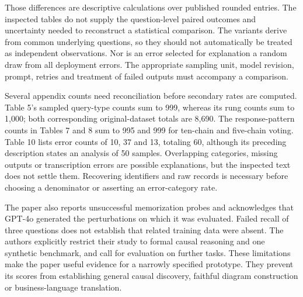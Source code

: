 Those differences are descriptive calculations over published rounded entries.
The inspected tables do not supply the question-level paired outcomes and
uncertainty needed to reconstruct a statistical comparison. The variants derive
from common underlying questions, so they should not automatically be treated
as independent observations. Nor is an error selected for explanation a random
draw from all deployment errors. The appropriate sampling unit, model revision,
prompt, retries and treatment of failed outputs must accompany a comparison.

Several appendix counts need reconciliation before secondary rates are computed.
Table 5's sampled query-type counts sum to 999, whereas its rung counts sum to
1,000; both corresponding original-dataset totals are 8,690. The response-pattern
counts in Tables 7 and 8 sum to 995 and 999 for ten-chain and five-chain voting.
Table 10 lists error counts of 10, 37 and 13, totaling 60, although its preceding
description states an analysis of 50 samples. Overlapping categories, missing
outputs or transcription errors are possible explanations, but the inspected
text does not settle them. Recovering identifiers and raw records is necessary
before choosing a denominator or asserting an error-category rate.
\citep{exec21_prophets,exec21_prophets_reference}

The paper also reports unsuccessful memorization probes and acknowledges that
GPT-4o generated the perturbations on which it was evaluated. Failed recall of
three questions does not establish that related training data were absent.
The authors explicitly restrict their study to formal causal reasoning and one
synthetic benchmark, and call for evaluation on further tasks. These limitations
make the paper useful evidence for a narrowly specified prototype. They prevent
its scores from establishing general causal discovery, faithful diagram
construction or business-language translation.\citep{exec21_prophets}

